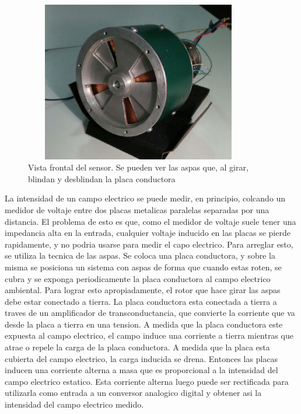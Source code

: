 \documentclass[a4paper]{article}
\begin{document}
\begin{figure}[h]
\centering
\includegraphics[width=10cm, height = 7cm]{sensor_1}
\caption{\small Vista frontal del sensor. Se pueden ver las aspas que, al girar, blindan y desblindan la placa conductora}
\label{fig:sensor_1}
\end{figure}


La intensidad de un campo electrico se puede medir, en principio, colcando un medidor de voltaje entre dos placas metalicas paralelas separadas por una distancia. El problema de esto es que, como el medidor de voltaje suele tener una impedancia alta en la entrada, cualquier voltaje inducido en las placas se pierde rapidamente, y no podria usarse para medir el capo electrico. Para arreglar esto, se utiliza la tecnica de las aspas. Se coloca una placa conductora, y sobre la misma se posiciona un sistema con aspas de forma que cuando estas roten, se cubra y se exponga periodicamente la placa conductora al campo electrico ambiental. Para lograr esto apropiadamente, el rotor que hace girar las aspas debe estar conectado a tierra. La placa conductora esta conectada a tierra a traves de un amplificador de transconductancia, que convierte la corriente que va desde la placa a tierra en una tension. A medida que la placa conductora este expuesta al campo electrico, el campo induce una corriente a tierra mientras que atrae o repele la carga de la placa conductora. A medida que la placa esta cubierta del campo electrico, la carga inducida se drena. Entonces las placas inducen una corriente alterna a masa que es proporcional a la intensidad del campo electrico estatico. Esta corriente alterna luego puede ser rectificada para utilizarla como entrada a un conversor analogico digital y obtener asi la intensidad del campo electrico medido.
\end{document}
